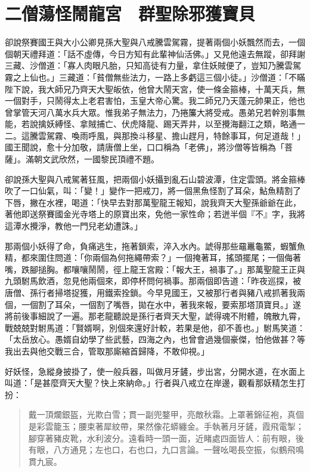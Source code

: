 
\chapter{二僧蕩怪鬧龍宮　群聖除邪獲寶貝}

卻說祭賽國王與大小公卿見孫大聖與八戒騰雲駕霧，提著兩個小妖飄然而去，一個個朝天禮拜道：「話不虛傳，今日方知有此輩神仙活佛。」又見他遠去無蹤，卻拜謝三藏、沙僧道：「寡人肉眼凡胎，只知高徒有力量，拿住妖賊便了，豈知乃騰雲駕霧之上仙也。」三藏道：「貧僧無些法力，一路上多虧這三個小徒。」沙僧道：「不瞞陛下說，我大師兄乃齊天大聖皈依，他曾大鬧天宮，使一條金箍棒，十萬天兵，無一個對手，只鬧得太上老君害怕，玉皇大帝心驚。我二師兄乃天蓬元帥果正，他也曾掌管天河八萬水兵大眾。惟我弟子無法力，乃捲簾大將受戒。愚弟兄若幹別事無能，若說擒妖縛怪、拿賊捕亡、伏虎降龍、踢天弄井，以至攪海翻江之類，略通一二。這騰雲駕霧、喚雨呼風，與那換斗移星、擔山趕月，特餘事耳，何足道哉！」國王聞說，愈十分加敬，請唐僧上坐，口口稱為「老佛」，將沙僧等皆稱為「菩薩」。滿朝文武欣然，一國黎民頂禮不題。

卻說孫大聖與八戒駕著狂風，把兩個小妖攝到亂石山碧波潭，住定雲頭。將金箍棒吹了一口仙氣，叫：「變！」變作一把戒刀，將一個黑魚怪割了耳朵，鮎魚精割了下唇，撇在水裡，喝道：「快早去對那萬聖龍王報知，說我齊天大聖孫爺爺在此，著他即送祭賽國金光寺塔上的原寶出來，免他一家性命；若迸半個『不』字，我將這潭水攪淨，教他一門兒老幼遭誅。」

那兩個小妖得了命，負痛逃生，拖著鎖索，淬入水內。諕得那些黿鼉龜鱉，蝦蟹魚精，都來圍住問道：「你兩個為何拖繩帶索？」一個掩著耳，搖頭擺尾；一個侮著嘴，跌腳搥胸。都嚷嚷鬧鬧，徑上龍王宮殿：「報大王，禍事了。」那萬聖龍王正與九頭駙馬飲酒，忽見他兩個來，即停杯問何禍事。那兩個即告道：「昨夜巡探，被唐僧、孫行者掃塔捉獲，用鐵索拴鎖。今早見國王，又被那行者與豬八戒抓著我兩個，一個割了耳朵，一個割了嘴唇，拋在水中，著我來報，要索那塔頂寶貝。」遂將前後事細說了一遍。那老龍聽說是孫行者齊天大聖，諕得魂不附體，魄散九霄，戰兢兢對駙馬道：「賢婿啊，別個來還好計較，若果是他，卻不善也。」駙馬笑道：「太岳放心。愚婿自幼學了些武藝，四海之內，也曾會過幾個豪傑，怕他做甚？等我出去與他交戰三合，管取那廝縮首歸降，不敢仰視。」

好妖怪，急縱身披掛了，使一般兵器，叫做月牙鏟，步出宮，分開水道，在水面上叫道：「是甚麼齊天大聖？快上來納命。」行者與八戒立在岸邊，觀看那妖精怎生打扮：
\begin{quote}
戴一頂爛銀盔，光欺白雪；貫一副兜鍪甲，亮敵秋霜。上罩著錦征袍，真個是彩雲籠玉；腰束著犀紋帶，果然像花蟒纏金。手執著月牙鏟，霞飛電掣；腳穿著豬皮靴，水利波分。遠看時一頭一面，近睹處四面皆人：前有眼，後有眼，八方通見；左也口，右也口，九口言論。一聲吆喝長空振，似鶴飛鳴貫九宸。
\end{quote}


